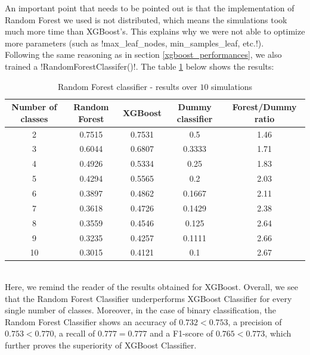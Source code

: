 \documentclass[]{article}
\begin{document}
\noindent
An important point that needs to be pointed out is that the \sklearn implementation of Random Forest we used is not distributed, which means the simulations took much more time than XGBoost's. This explains why we were not able to optimize more parameters (such as \pyth!max_leaf_nodes, min_samples_leaf, etc.!).\\

\noindent
Following the same reasoning as in section \ref{xgboost_performances}, we also trained a \pyth!RandomForestClassifer()!. The table \ref{results_randomForestClassifier} below shows the results:
\begin{table}[!h]
	\centering
	\begin{tabular}{|c|c|c|c|c|}
		\hline
		
		\textbf{Number of classes} & \textbf{Random Forest} & \textbf{XGBoost} & \textbf{Dummy classifier} & \textbf{Forest/Dummy ratio}\\
		\hline
		2 & 0.7515 & 0.7531 & 0.5 & 1.46\\
		\hline 
		3 & 0.6044 & 0.6807 & 0.3333 & 1.71\\
		\hline 
		4 & 0.4926 & 0.5334 & 0.25 &  1.83\\
		\hline 
		5 & 0.4294 & 0.5565 & 0.2 &  2.03\\
		\hline 
		6 & 0.3897 & 0.4862 & 0.1667 & 2.11\\
		\hline 
		7 & 0.3618 & 0.4726 & 0.1429 & 2.38\\
		\hline 
		8 & 0.3559 & 0.4546 & 0.125 & 2.64\\
		\hline 
		9 & 0.3235 & 0.4257 & 0.1111 &  2.66\\
		\hline 
		10 & 0.3015 & 0.4121 & 0.1 &  2.67\\
		\hline 
	\end{tabular}
	\caption{Random Forest classifier - results over $10$ simulations}
	\label{results_randomForestClassifier}
\end{table}\\
Here, we remind the reader of the results obtained for XGBoost. Overall, we see that the Random Forest Classifier underperforms XGBoost Classifier for every single number of classes. Moreover, in the case of binary classification, the Random Forest Classifier shows an accuracy of $0.732<0.753$, a precision of $0.753<0.770$, a recall of $0.777=0.777$ and a F1-score of $0.765<0.773$, which further proves the superiority of XGBoost Classifier.

\newpage
\end{document}
